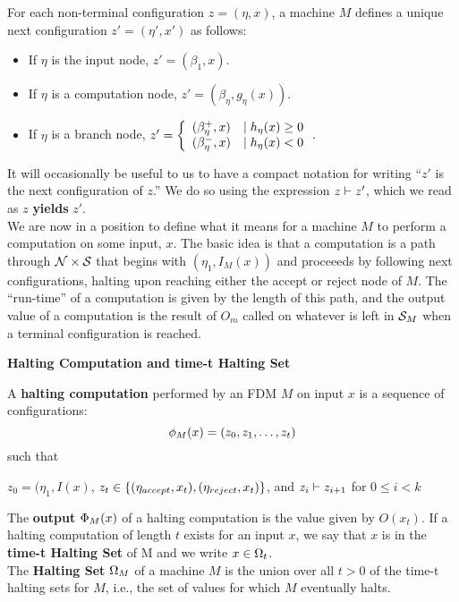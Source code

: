 For each non-terminal configuration $z = (\eta, x)$, a machine $M$
defines a unique next configuration $z' = (\eta', x')$ as follows:

\begin{itemize}
\item If $\eta$ is the input node, $z' = (\beta_{1}, x)$.
\item If $\eta$ is a computation node, $z' = (\beta_{\eta}, g_\eta(x))$.
\item If $\eta$ is a branch node, $z' = \left\{ \begin{array}{ll} (\beta_\eta^+,
    x) & \mid h_\eta(x) \geq 0 \\ (\beta_\eta^-, x) & \mid h_\eta(x) < 0 \end{array} \right.$.
\end{itemize}

It will occasionally be useful to us to have a compact notation for
writing ``$z'$ is the next configuration of $z$.''  We do so using the
expression $z \vdash z'$, which we read as $z$ \textbf{yields} $z'$.\\

We are now in a position to define what it means for a machine $M$ to
perform a computation on some input, $x$.  The basic idea is that a
computation is a path through $\mathcal{N} \times \mathcal{S}$ that begins
with $(\eta_1, I_M(x))$ and proceeeds by following next
configurations, halting upon reaching either the accept or reject node
of $M$.  The ``run-time'' of a computation is given by the length of
this path, and the output value of a computation is the result of
$O_m$ called on whatever is left in $\mathcal{S}_M$ when a terminal
configuration is reached.\\

\begin{definition}{\textbf{Halting Computation and time-t Halting Set}}

  A \textbf{halting computation} performed by an FDM $M$ on input $x$
  is a sequence of configurations: 
  $$\phi_M(x) = (z_0, z_1, \ldots, z_t)$$ such that
  
  \centerline{$z_0 = (\eta_1, I(x)$, $z_t \in \{(\eta_{accept}, x_t),
      (\eta_{reject}, x_t)\}$, and $z_i \vdash z_{i+1}$ for $0 \leq i < k$}
  
  \vspace{\baselineskip}
  
  The \textbf{output} $\Phi_M(x)$ of a halting computation is
  the value given by $O(x_t)$.  If a halting computation of length $t$
  exists for an input $x$, we say that $x$ is in the \textbf{time-t
    Halting Set} of M and we write $x \in \Omega_t$.  \\

  The \textbf{Halting Set} $\Omega_M$ of a machine $M$ is the union
  over all $t > 0$ of the time-t halting sets for $M$, i.e., the set of
  values for which $M$ eventually halts.
\end{definition}

